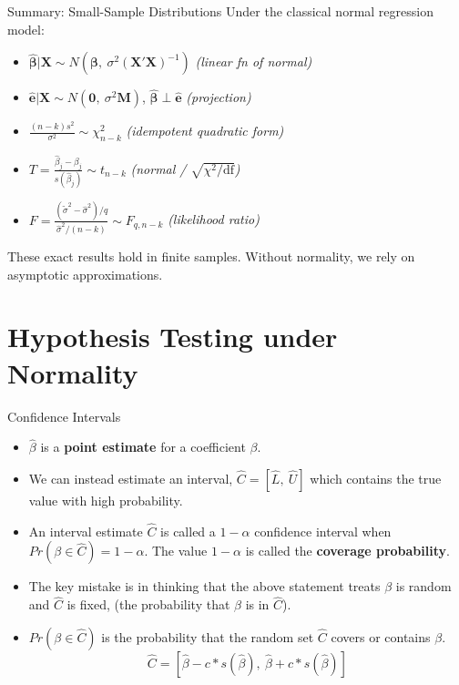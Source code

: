 \documentclass[aspectratio=169, handout, t]{beamer}
\numberwithin{equation}{section}
\begin{document}
\begin{frame}{Summary: Small-Sample Distributions}
Under the classical normal regression model:\pause
\begin{itemize}\setlength{\itemsep}{4pt}
\item $\hat{\bm{\beta}}|\bm{X}\sim N(\bm{\beta},\ \sigma^2(\bm{X'X})^{-1})$ \hfill \emph{(linear fn of normal)}\pause
\item $\hat{\bm{e}}|\bm{X}\sim N(\bm{0},\ \sigma^2\bm{M})$, \quad $\hat{\bm{\beta}}\perp\hat{\bm{e}}$ \hfill \emph{(projection)}\pause
\item $\frac{(n-k)s^2}{\sigma^2}\sim \chi^2_{n-k}$ \hfill \emph{(idempotent quadratic form)}\pause
\item $T=\frac{\hat{\beta}_j-\beta_j}{s(\hat{\beta}_j)}\sim t_{n-k}$ \hfill \emph{(normal / $\sqrt{\chi^2/\text{df}}$)}\pause
\item $F=\frac{(\tilde{\sigma}^2-\hat{\sigma}^2)/q}{\hat{\sigma}^2/(n-k)}\sim F_{q,n-k}$ \hfill \emph{(likelihood ratio)}\pause
\end{itemize}
\medskip
These \alert{exact} results hold in finite samples.  Without normality, we rely on asymptotic approximations.
\end{frame}

\section{Hypothesis Testing under Normality}

\begin{frame}{Confidence Intervals}
\begin{itemize}
\item $\hat{\beta}$ is a \textbf{point estimate} for a coefficient $\beta$.  \pause
\item We can instead estimate an interval, $\hat{C}=[\hat{L},\ \hat{U}]$ which contains the true value with high probability. \pause
\item An interval estimate $\hat{C}$ is called a $1-\alpha$ confidence interval when $Pr(\beta \in \hat{C})=1-\alpha$.  The value $1-\alpha$ is called the \textbf{coverage probability}. \pause
\item The key mistake is in thinking that the above statement treats $\beta$ is random and $\hat{C}$ is fixed, (the probability that $\beta$ is in $\hat{C}$).   \pause
\item $Pr(\beta \in \hat{C})$ is the probability that the random set $\hat{C}$ covers or contains $\beta$.  \pause
$$\hat{C}=[\hat{\beta}-c*s(\hat{\beta}),\ \hat{\beta}+c*s(\hat{\beta})]$$
\end{itemize}
\end{frame}
\end{document}
